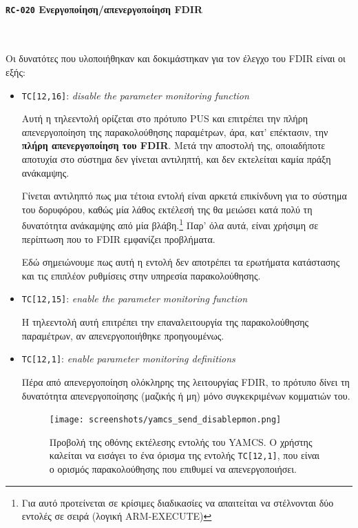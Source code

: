 \documentclass[a4paper,nobib]{tufte-book}
\begin{document}
\paragraph{\textbf{\texttt{RC-020} Ενεργοποίηση/απενεργοποίηση \acs{FDIR}}}~

Οι δυνατότες που υλοποιήθηκαν και δοκιμάστηκαν για τον έλεγχο του \acs{FDIR} είναι οι εξής:
\begin{itemize}
	\item \texttt{TC[12,16]}: \emph{disable the parameter monitoring function}
	
	Αυτή η τηλεεντολή ορίζεται στο πρότυπο \acs{PUS} και επιτρέπει την πλήρη απενεργοποίηση της παρακολούθησης παραμέτρων, άρα, κατ' επέκτασιν, την \textbf{πλήρη απενεργοποίηση του \acs{FDIR}}. Μετά την αποστολή της, οποιαδήποτε αποτυχία στο σύστημα δεν γίνεται αντιληπτή, και δεν εκτελείται καμία πράξη ανάκαμψης.
	
	Γίνεται αντιληπτό πως μια τέτοια εντολή είναι αρκετά επικίνδυνη για το σύστημα του δορυφόρου, καθώς μία λάθος εκτέλεσή της θα μειώσει κατά πολύ τη δυνατότητα ανάκαμψης από μία βλάβη.\footnote{Για αυτό προτείνεται σε κρίσιμες διαδικασίες να απαιτείται να στέλνονται δύο εντολές σε σειρά (λογική ARM-EXECUTE)} Παρ' όλα αυτά, είναι χρήσιμη σε περίπτωση που το \acs{FDIR} εμφανίζει προβλήματα.
	
	Εδώ σημειώνουμε πως αυτή η εντολή δεν αποτρέπει τα ερωτήματα κατάστασης και τις επιπλέον ρυθμίσεις στην υπηρεσία παρακολούθησης.
	
	\item \texttt{TC[12,15]}: \emph{enable the parameter monitoring function}
	
	Η τηλεεντολή αυτή επιτρέπει την επαναλειτουργία της παρακολούθησης παραμέτρων, αν απενεργοποιήθηκε προηγουμένως.
	
	\item \texttt{TC[12,1]}: \emph{enable parameter monitoring definitions}
	
	Πέρα από απενεργοποίηση ολόκληρης της λειτουργίας \acs{FDIR}, το πρότυπο δίνει τη δυνατότητα απενεργοποίησης (μαζικής ή μη) μόνο συγκεκριμένων κομματιών του.
	
	\begin{figure}[h]
		\texttt{[image: screenshots/yamcs\_send\_disablepmon.png]}
		\caption[Προβολή της οθόνης εκτέλεσης εντολής του \acs{YAMCS}]{Προβολή της οθόνης εκτέλεσης εντολής του \acs{YAMCS}. Ο χρήστης καλείται να εισάγει το ένα όρισμα της εντολής \texttt{TC[12,1]}, που είναι ο ορισμός παρακολούθησης που επιθυμεί να απενεργοποιήσει.}
		\label{fig:yamcssenddisablepmon}
	\end{figure}


\end{itemize}
\end{document}
